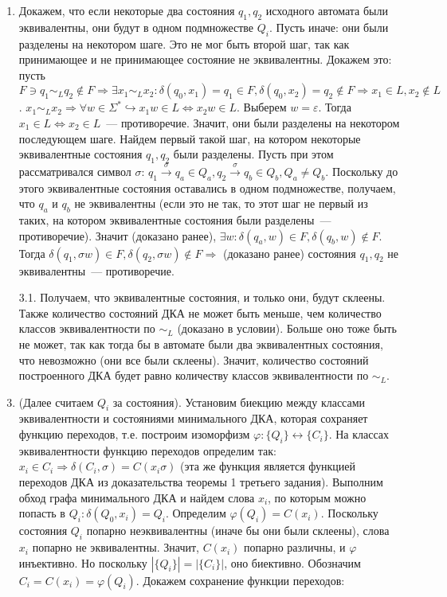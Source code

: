 \documentclass[a4paper]{article}
\begin{document}
\begin{enumerate}[1.]
\item Докажем, что если некоторые два состояния $q_1,q_2$ исходного автомата были эквивалентны, они будут в одном подмножестве $Q_i$. Пусть иначе: они были разделены на некотором шаге.\newline
Это не мог быть второй шаг, так как принимающее и не принимающее состояние не эквивалентны. Докажем это: пусть $F\ni q_1\sim_L q_2\notin F\Rightarrow \exists x_1\sim_L x_2\colon \delta(q_0,x_1)=q_1\in F,\delta(q_0,x_2)=q_2\notin F\Rightarrow x_1\in L,x_2\notin L$. $x_1\sim_L x_2\Rightarrow \forall w\in\Sigma^*\hookrightarrow x_1w\in L\Leftrightarrow x_2w\in L$. Выберем $w=\varepsilon$. Тогда $x_1\in L \Leftrightarrow x_2\in L$~--- противоречие.\newline
Значит, они были разделены на некотором последующем шаге. Найдем первый такой шаг, на котором некоторые эквивалентные состояния $q_1,q_2$ были разделены. Пусть при этом  рассматривался символ $\sigma$: $q_1\overset{\sigma}{\longrightarrow}q_a\in Q_a,q_2\overset{\sigma}{\longrightarrow}q_b\in Q_b,Q_a\neq Q_b$. Поскольку до этого
эквивалентные состояния оставались в одном подмножестве, получаем, что $q_a$ и $q_b$ не эквивалентны (если это не так, то этот шаг не первый из таких, на котором эквивалентные состояния были разделены~--- противоречие). Значит (доказано ранее), $\exists w\colon \delta(q_a,w)\in F,\delta(q_b,w)\notin F$. Тогда $\delta(q_1,\sigma w)\in F,\delta(q_2,\sigma w)\notin F\Rightarrow$ (доказано ранее) состояния $q_1,q_2$ не эквивалентны~--- противоречие.
\item[3.1.] Получаем, что эквивалентные состояния, и только они, будут склеены. Также количество состояний ДКА не может быть меньше, чем количество классов эквивалентности по $\sim_L$ (доказано в условии). Больше оно тоже быть не может, так как тогда бы в автомате были два эквивалентных состояния, что невозможно (они все были склеены). Значит, количество состояний построенного ДКА будет равно количеству классов эквивалентности по $\sim_L$.
\item (Далее считаем $Q_i$ за состояния). Установим биекцию между классами эквивалентности и состояниями минимального ДКА, которая сохраняет функцию переходов, т.е. построим изоморфизм $\varphi\colon \{Q_i\}\leftrightarrow \{C_i\}$. На классах эквивалентности функцию переходов определим так: $x_i\in C_i\Rightarrow \delta(C_i,\sigma)=C(x_i\sigma)$ (эта же функция является функцией переходов ДКА из доказательства теоремы 1 третьего задания). Выполним обход графа минимального ДКА и найдем слова $x_i$, по которым можно попасть в $Q_i\colon \delta(Q_0,x_i)=Q_i$. Определим $\varphi(Q_i)=C(x_i)$. Поскольку состояния $Q_i$ попарно неэквивалентны (иначе бы они были склеены), слова $x_i$ попарно не эквивалентны. Значит, $C(x_i)$ попарно различны, и $\varphi$ инъективно. Но поскольку $|\{Q_i\}|=|\{C_i\}|$, оно биективно. Обозначим $C_i=C(x_i)=\varphi(Q_i)$. Докажем сохранение функции переходов:\newline

\end{enumerate}
\end{document}
